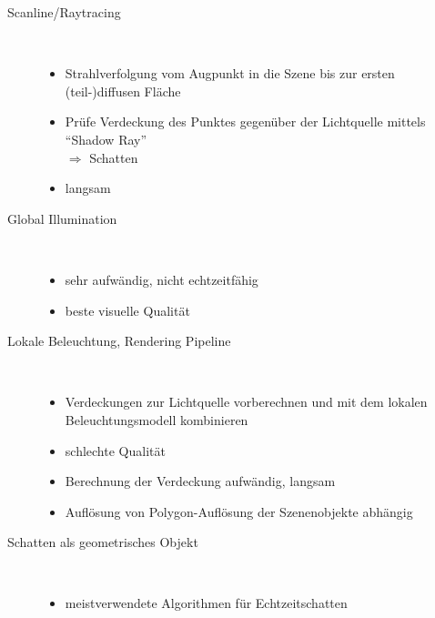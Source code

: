 \documentclass[a4paper, 12pt]{article}
\begin{document}
\begin{description}
  \item[Scanline/Raytracing]~
    \begin{itemize}
      \item Strahlverfolgung vom Augpunkt in die Szene bis zur ersten (teil-)diffusen Fläche
      \item Prüfe Verdeckung des Punktes gegenüber der Lichtquelle mittels ``Shadow Ray''\\\(\Rightarrow\) Schatten
    \end{itemize}
    \begin{itemize}
      \renewcommand{\labelitemi}{\(-\)}%
      \item langsam
    \end{itemize}
  \item[Global Illumination]~
    \begin{itemize}
      \renewcommand{\labelitemi}{\(-\)}%
      \item sehr aufwändig, nicht echtzeitfähig
    \end{itemize}
    \begin{itemize}
      \renewcommand{\labelitemi}{+}%
      \item beste visuelle Qualität
    \end{itemize}
  \item[Lokale Beleuchtung, Rendering Pipeline]~
    \begin{itemize}
      \item Verdeckungen zur Lichtquelle vorberechnen und mit dem lokalen Beleuchtungsmodell kombinieren
    \end{itemize}
    \begin{itemize}
      \renewcommand{\labelitemi}{\(-\)}%
      \item schlechte Qualität
      \item Berechnung der Verdeckung aufwändig, langsam
      \item Auflösung von Polygon-Auflösung der Szenenobjekte abhängig
    \end{itemize}
  \item[Schatten als geometrisches Objekt]~
    \begin{itemize}
      \item meistverwendete Algorithmen für Echtzeitschatten
    \end{itemize}
\end{description}
\end{document}
